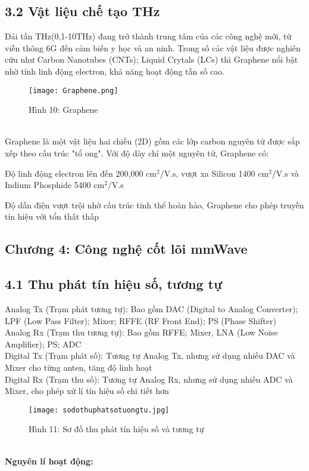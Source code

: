 \documentclass[a4paper,13pt]{article} %
\begin{document}
\subsection{3.2 Vật liệu chế tạo THz}
Dải tần THz(0,1-10THz) đang trở thành trung tâm của các công nghệ mới, từ viễn thông 6G đến cảm biến y học và an ninh. Trong số các vật liệu được nghiên cứu như Carbon Nanotubes (CNTs); Liquid Crytals (LCs) thì Graphene nổi bật nhờ tính linh động electron, khả năng hoạt động tần số cao. 
\begin{figure}[htbp]
    \centering
    \texttt{[image: Graphene.png]}
    \caption*{Hình 10: Graphene \cite{key4} }
    \label{fig:model}
\end{figure} \\
Graphene là một vật liệu hai chiều (2D) gồm các lớp carbon nguyên tử được sắp xếp theo cấu trúc "tổ ong". Với độ dày chỉ một nguyên tử, Graphene có:

 \item Độ linh động electron lên đến 200,000 \( \text{cm}^2 \)/V.s, vượt xa Silicon 1400  \( \text{cm}^2 \)/V.s và Indium Phosphide 5400 \( \text{cm}^2 \)/V.s

 \item Độ dẫn điện vượt trội nhờ cấu trúc tinh thể hoàn hảo, Graphene cho phép truyền tín hiệu với tổn thất thấp

\begin{center}
    \section{Chương 4: Công nghệ cốt lõi mmWave}
\end{center}
\subsection{4.1 Thu phát tín hiệu số, tương tự}
Analog Tx (Trạm phát tương tự): Bao gồm DAC (Digital to Analog Converter); LPF (Low Pass Filter); Mixer; RFFE (RF Front End); PS (Phase Shifter) \\ 

Analog Rx (Trạm thu tương tự): Bao gồm RFFE; Mixer, LNA (Low Noise Amplifier); PS; ADC \\

Digital Tx (Trạm phát số): Tương tự Analog Tx, nhưng sử dụng nhiều DAC và Mixer cho từng anten, tăng độ linh hoạt \\

Digital Rx (Trạm thu số): Tương tự Analog Rx, nhưng sử dụng nhiều ADC và Mixer, cho phép xử lí tín hiệu số chi tiết hơn
\begin{figure}[htbp]
    \centering
    \texttt{[image: sodothuphatsotuongtu.jpg]}
    \caption*{Hình 11: Sơ đồ thu phát tín hiệu số và tương tự  \cite{key8} }
    \label{fig:model}
\end{figure} \\
\textbf{Nguyên lí hoạt động:} \\
\end{document}
